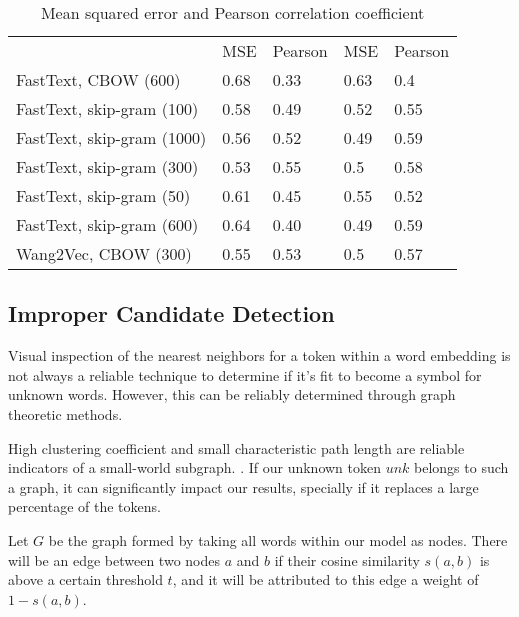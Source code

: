 \documentclass[12pt]{article}
\begin{document}
\begin{table}[]
	\centering
	\caption{Mean squared error and Pearson correlation coefficient }
	\begin{tabular}{lllll}
		& MSE & Pearson & MSE & Pearson \\
		FastText, CBOW (600)       & 0.68              & 0.33                  & 0.63                 & 0.4                      \\
		FastText, skip-gram (100)  & 0.58              & 0.49                  & 0.52                 & 0.55                     \\
		FastText, skip-gram (1000) & 0.56              & 0.52                  & 0.49                 & 0.59                     \\
		FastText, skip-gram (300)  & 0.53              & 0.55                  & 0.5                  & 0.58                     \\
		FastText, skip-gram (50)   & 0.61              & 0.45                  & 0.55                 & 0.52                     \\
		FastText, skip-gram (600)  & 0.64              & 0.40                  & 0.49                 & 0.59                     \\
		Wang2Vec, CBOW (300)       & 0.55              & 0.53                  & 0.5                  & 0.57                    
	\end{tabular}
\end{table}

\subsection{Improper Candidate Detection}

Visual inspection of the nearest neighbors for a token within a word embedding is not always a reliable technique to determine if it's fit to become a symbol for unknown words. However, this can be reliably determined through graph theoretic methods. 

High clustering coefficient and small characteristic path length are reliable indicators of a small-world subgraph. \cite[p.35]{Cecchini2017GraphbasedCA}. If our unknown token $unk$ belongs to such a graph, it can significantly impact our results, specially if it replaces a large percentage of the tokens.

Let $G$ be the graph formed by taking all words within our model as nodes. There will be an edge between two nodes $a$ and $b$ if their cosine similarity $s(a,b)$ is above a certain threshold $t$, and it will be attributed to this edge a weight of $1 - s(a,b)$.
\end{document}
